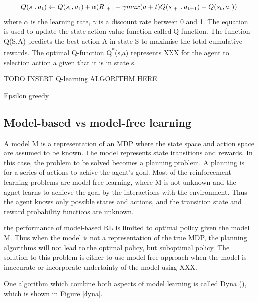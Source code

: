 \documentclass[12pt,twoside]{report}
\begin{document}
\begin{equation}
Q(s\textsubscript{t},a\textsubscript{t}) \leftarrow Q(s\textsubscript{t},a\textsubscript{t}) + \alpha(R\textsubscript{t+1} + \gamma max (a+t) Q(s\textsubscript{t+1}, a\textsubscript{t+1}) - Q(s\textsubscript{t}, a\textsubscript{t}))

\end{equation}
where $\alpha$ is the learning rate, $\gamma$ is a discount rate between 0 and 1. The equation is used to update the state-action value function called Q function. The function Q(S,A) predicts the best action A in state S to maximise the total cumulative rewards.
The optimal Q-function Q\textsuperscript{*}(s,a) represents XXX for the agent to selection action a given that it is in state s.


TODO INSERT Q-learning ALGORITHM HERE

Epsilon greedy

\subsection{Model-based vs model-free learning}

A model M is a representation of an MDP where the state space and action space are assumed to be known. The model represents state transitions and rewards. In this case, the problem to be solved becomes a planning problem. A planning is for a series of actions to achive the agent's goal.
Most of the reinforcement learning problems are model-free learning, where M is not unknown and the agnet learns to achieve the goal by the interactions with the environment. Thus the agent knows only possible states and actions, and the transition state and reward probability functions are unknown.

the performance of model-based RL is limited to optimal policy given the model M. Thus when the model is not a representation of the true MDP, the planning algorithms will not lead to the optimal policy, but suboptimal policy. The solution to this problem is either to use model-free approach when the model is inaccurate or incorporate undertainty of the model using XXX.

One algorithm which combine both aspects of model learning is called Dyna (\cite{Sutton1990}), which is shown in Figure \ref{dyna}.
\end{document}
